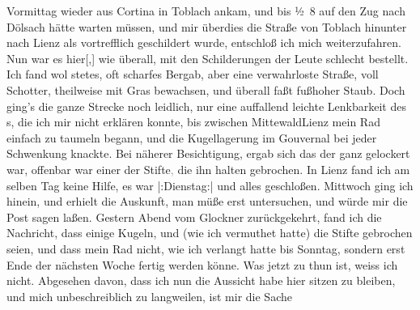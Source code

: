\begin{ledgroupsized}[t]{13cm}
                  Vormittag wieder aus Cortina in
                  Toblach ankam, und bis ½ 8 auf
               den Zug nach Dölsach hätte warten müssen, und mir
               überdies die Straße von Toblach hinunter nach Lienz als vortrefflich geschildert wurde,
               entschloß ich mich weiterzufahren. Nun war es hier{[},{]}{ }{\pb}wie überall, mit den
               Schilderungen der Leute schlecht bestellt. Ich fand wol stetes, oft scharfes Bergab,
               aber eine verwahrloste Straße, voll Schotter, theilweise mit Gras bewachsen, und
               überall faßt fußhoher Staub. Doch ging’s die ganze Strecke noch leidlich, nur eine
               auffallend leichte Lenkbarkeit des \label{K_L03128-2v}\label{K_L03128-2h}s, die
               ich mir nicht erklären konnte, bis zwischen MittewaldLienz mein Rad einfach zu taumeln begann, und die
               Kugellagerung im Gouvernal bei jeder Schwenkung knackte. Bei näherer Besichtigung,
               ergab sich das der \label{K_L03128-3v}\label{K_L03128-3h} ganz gelockert
               war, offenbar war einer der Stifte\textcolor{gray}{,} die ihn halten gebrochen. In Lienz fand ich am selben Tag
               keine Hilfe, es war |:Dienstag:| \label{K_L03128-4v}\label{K_L03128-4h} und alles geschloßen. Mittwoch ging ich hinein, und erhielt die Auskunft, man
               müße erst untersuchen, und würde mir die Post sagen laßen. Gestern{ }Abend vom Glockner zurückgekehrt,
               fand ich die Nachricht, dass einige Kugeln, und (wie ich vermuthet hatte) die Stifte
               gebrochen seien, und dass mein Rad nicht, wie ich {\pb}verlangt hatte bis Sonntag, sondern erst Ende der nächsten Woche fertig
               werden könne. Was jetzt zu thun ist, weiss ich nicht. Abgesehen davon, dass ich nun
               die Aussicht habe hier sitzen zu bleiben, und mich unbeschreiblich zu langweilen, ist
               mir die Sache \label{K_L03128-5v}
\end{ledgroupsized}
